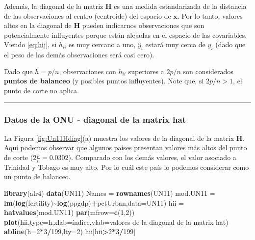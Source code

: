 \documentclass[
]{article}
\newenvironment{Shaded}{\begin{snugshade}}{\end{snugshade}}
\newcommand{\AttributeTok}[1]{\textcolor[rgb]{0.13,0.29,0.53}{#1}}
\newcommand{\DecValTok}[1]{\textcolor[rgb]{0.00,0.00,0.81}{#1}}
\newcommand{\FunctionTok}[1]{\textcolor[rgb]{0.13,0.29,0.53}{\textbf{#1}}}
\newcommand{\NormalTok}[1]{#1}
\newcommand{\OtherTok}[1]{\textcolor[rgb]{0.56,0.35,0.01}{#1}}
\newcommand{\SpecialCharTok}[1]{\textcolor[rgb]{0.81,0.36,0.00}{\textbf{#1}}}
\newcommand{\StringTok}[1]{\textcolor[rgb]{0.31,0.60,0.02}{#1}}
\begin{document}
Además, la diagonal de la matriz \(\boldsymbol H\) es una medida estandarizada de la distancia de las observaciones al centro (centroide) del espacio de \(\boldsymbol x\). Por lo tanto, valores altos en la diagonal de \(\boldsymbol H\) pueden indicarnos observaciones que son potencialmente influyentes porque están alejadas en el espacio de las covariables. Viendo \eqref{eq:hij}, si \(h_{ii}\) es muy cercano a uno, \(\widehat{y}_{i}\) estará muy cerca de \(y_{i}\) (dado que el peso de las demás observaciones será casi cero).

Dado que \(\bar{h} = p/n\), observaciones con \(h_{ii}\) superiores a \(2p/n\) son considerados \textbf{puntos de balanceo} (y posibles puntos influyentes). Note que, si \(2p/n > 1\), el punto de corte no aplica.

\rule{\textwidth}{0.4pt}

\hypertarget{datos-de-la-onu---diagonal-de-la-matrix-hat}{%
\subsubsection*{Datos de la ONU - diagonal de la matrix hat}\label{datos-de-la-onu---diagonal-de-la-matrix-hat}}

La Figura \ref{fig:Un11Hdiag}(a) muestra los valores de la diagonal de la matrix \(\boldsymbol H\). Aquí podemos observar que algunos países presentan valores más altos del punto de corte (\(2\frac{p}{n} = 0.0302\)). Comparado con los demás valores, el valor asociado a Trinidad y Tobago es muy alto. Por lo cuál este país lo podemos considerar como un punto de balanceo.

\begin{Shaded}
\begin{Highlighting}[]
\FunctionTok{library}\NormalTok{(alr4)}
\FunctionTok{data}\NormalTok{(UN11)}
\NormalTok{Names }\OtherTok{=} \FunctionTok{rownames}\NormalTok{(UN11)}
\NormalTok{mod.UN11 }\OtherTok{=} \FunctionTok{lm}\NormalTok{(}\FunctionTok{log}\NormalTok{(fertility)}\SpecialCharTok{\textasciitilde{}}\FunctionTok{log}\NormalTok{(ppgdp)}\SpecialCharTok{+}\NormalTok{pctUrban,}\AttributeTok{data=}\NormalTok{UN11)}
\NormalTok{hii }\OtherTok{=} \FunctionTok{hatvalues}\NormalTok{(mod.UN11)}
\FunctionTok{par}\NormalTok{(}\AttributeTok{mfrow=}\FunctionTok{c}\NormalTok{(}\DecValTok{1}\NormalTok{,}\DecValTok{2}\NormalTok{))}
\FunctionTok{plot}\NormalTok{(hii,}\AttributeTok{type=}\StringTok{\textquotesingle{}h\textquotesingle{}}\NormalTok{,}\AttributeTok{xlab=}\StringTok{\textquotesingle{}índice\textquotesingle{}}\NormalTok{,}\AttributeTok{ylab=}\StringTok{\textquotesingle{}valores de la diagonal de la matrix hat\textquotesingle{}}\NormalTok{)}
\FunctionTok{abline}\NormalTok{(}\AttributeTok{h=}\DecValTok{2}\SpecialCharTok{*}\DecValTok{3}\SpecialCharTok{/}\DecValTok{199}\NormalTok{,}\AttributeTok{lty=}\DecValTok{2}\NormalTok{)}
\NormalTok{hii[hii}\SpecialCharTok{\textgreater{}}\DecValTok{2}\SpecialCharTok{*}\DecValTok{3}\SpecialCharTok{/}\DecValTok{199}\NormalTok{]}
\end{Highlighting}
\end{Shaded}
\end{document}
